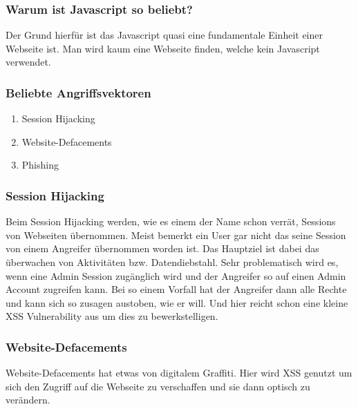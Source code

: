 \subsubsection{Warum ist Javascript so beliebt?}
Der Grund hierfür ist das Javascript quasi eine fundamentale Einheit einer Webseite ist. Man wird kaum eine Webseite finden, welche kein Javascript verwendet.
\subsubsection{Beliebte Angriffsvektoren}
\begin{enumerate}
\item Session Hijacking
\item Website-Defacements 
\item Phishing
\end{enumerate}
\subsubsection{Session Hijacking}
Beim Session Hijacking werden, wie es einem der Name schon verrät, Sessions von Webseiten übernommen. Meist bemerkt ein User gar nicht das seine Session von einem Angreifer übernommen worden ist. Das Hauptziel ist dabei das überwachen von Aktivitäten bzw. Datendiebstahl. Sehr problematisch wird es, wenn eine Admin Session zugänglich wird und der Angreifer so auf einen Admin Account zugreifen kann. Bei so einem Vorfall hat der Angreifer dann alle Rechte und kann sich so zusagen austoben, wie er will. Und hier reicht schon eine kleine XSS Vulnerability aus um dies zu bewerkstelligen. 
\subsubsection{Website-Defacements}
Website-Defacements hat etwas von digitalem Graffiti. Hier wird XSS genutzt um sich den Zugriff auf die Webseite zu verschaffen und sie dann optisch zu verändern. 
